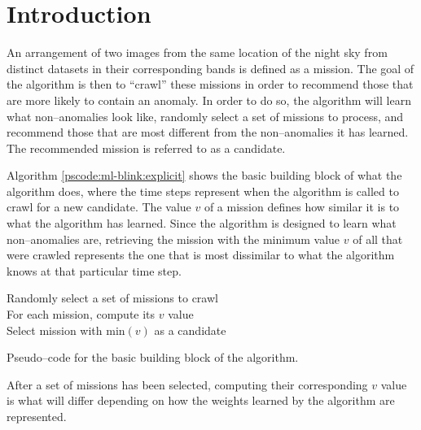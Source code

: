\section{Introduction} \label{sect:meth:intro}

An arrangement of two images from the same location of the night sky from distinct datasets in their corresponding bands is defined as a mission. The goal of the \mlblink algorithm is then to ``crawl'' these missions in order to recommend those that are more likely to contain an anomaly. In order to do so, the \mlblink algorithm will learn what non--anomalies look like, randomly select a set of missions to process, and recommend those that are most different from the non--anomalies it has learned. The recommended mission is referred to as a candidate.

Algorithm \ref{pscode:ml-blink:explicit} shows the basic building block of what the \mlblink algorithm does, where the time steps represent when the algorithm is called to crawl for a new candidate. The value $v$ of a mission defines how similar it is to what the \mlblink algorithm has learned. Since the \mlblink algorithm is designed to learn what non--anomalies are, retrieving the mission with the minimum value $v$ of all that were crawled represents the one that is most dissimilar to what the \mlblink algorithm knows at that particular time step.

\vspace{0.4cm}
\begin{algorithm}[H]
    \SetAlgoLined
        \FMain{} {
             {
                Randomly select a set of missions to crawl \\
                For each mission, compute its $v$ value \\
                Select mission with $\text{min}(v)$ as a candidate \\
            }
        }
    \caption{Pseudo--code for the basic building block of the \mlblink algorithm.}
    \label{pscode:ml-blink:explicit}
\end{algorithm}
\vspace{0.4cm}

After a set of missions has been selected, computing their corresponding $v$ value is what will differ depending on how the weights learned by the algorithm are represented.